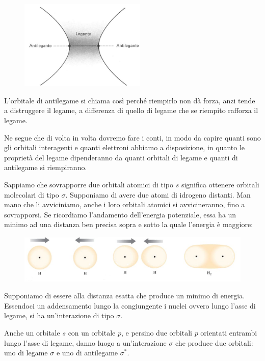 \begin{figure}[htp]
    \centering
    \includegraphics[width=6cm]{immagini/spazio_legante_antilegante.png}
\end{figure}

L'orbitale di antilegame si chiama così perché riempirlo non dà forza, anzi tende a distruggere il legame, a differenza di quello di legame che se riempito rafforza il legame.

Ne segue che di volta in volta dovremo fare i conti, in modo da capire quanti sono gli orbitali interagenti e quanti elettroni abbiamo a disposizione, in quanto le proprietà del legame dipenderanno da quanti orbitali di legame e quanti di antilegame si riempiranno.

\vspace{0.2cm}Sappiamo che sovrapporre due orbitali atomici di tipo $s$ significa ottenere orbitali molecolari di tipo $\sigma$. Supponiamo di avere due atomi di idrogeno distanti. Man mano che li avviciniamo, anche i loro orbitali atomici si avvicineranno, fino a sovrapporsi. Se ricordiamo l'andamento dell'energia potenziale, essa ha un minimo ad una distanza ben precisa sopra e sotto la quale l'energia è maggiore:

\begin{figure}[htp]
    \centering
    \includegraphics[width=12cm]{immagini/avvicinamento_orbitali.png}
\end{figure}

Supponiamo di essere alla distanza esatta che produce un minimo di energia. Essendoci un addensamento lungo la congiungente i nuclei ovvero lungo l'asse di legame, si ha un'interazione di tipo $\sigma$.

\vspace{0.2cm}Anche un orbitale $s$ con un orbitale $p$, e persino due orbitali $p$ orientati entrambi lungo l'asse di legame, danno luogo a un'interazione $\sigma$ che produce due orbitali: uno di legame  $\sigma$ e uno di antilegame  $\sigma^*$.

